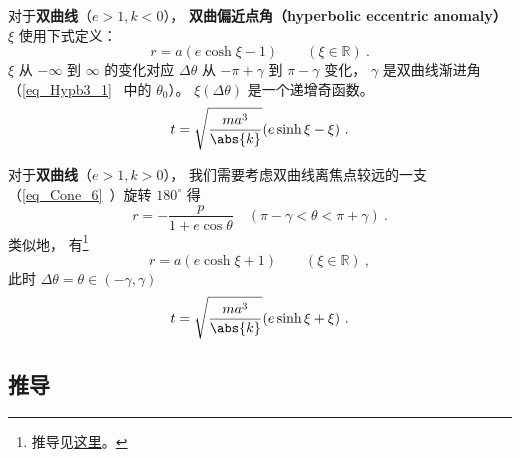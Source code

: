 对于\textbf{双曲线}（$e>1, k<0$）， \textbf{双曲偏近点角（hyperbolic eccentric anomaly）} $\xi$ 使用下式定义：
\begin{equation}\label{eq_EqMoKp_2} %
r = a(e\cosh\xi - 1) \qquad (\xi \in \mathbb R)~.
\end{equation}
$\xi$ 从 $-\infty$ 到 $\infty$ 的变化对应 $\Delta\theta$ 从 $-\pi+\gamma$ 到 $\pi-\gamma$ 变化， $\gamma$ 是双曲线渐进角（\autoref{eq_Hypb3_1}~ 中的 $\theta_0$）。 $\xi(\Delta\theta)$ 是一个递增奇函数。
\begin{equation}\label{eq_EqMoKp_4} %
t = \sqrt{\frac{ma^3}{\abs{k}}} (e\sinh\xi - \xi)~.
\end{equation}

对于\textbf{双曲线}（$e>1, k>0$）， 我们需要考虑双曲线离焦点较远的一支（\autoref{eq_Cone_6}~）旋转 $180^\circ$ 得
\begin{equation} %
r = -\frac{p}{1 + e\cos\theta} \quad (\pi-\gamma<\theta<\pi+\gamma)~.
\end{equation}
类似地， 有\footnote{推导见\href{https://comethunter.lamost.org/scwrk/THECAL/fkepler.pdf}{这里}。}
\begin{equation} %
r = a(e\cosh\xi + 1) \qquad (\xi \in \mathbb R)~,
\end{equation}
此时 $\Delta\theta = \theta \in (-\gamma, \gamma)$
\begin{equation}\label{eq_EqMoKp_6} %
t = \sqrt{\frac{ma^3}{\abs{k}}} (e\sinh\xi + \xi)~.
\end{equation}

\subsection{推导}
